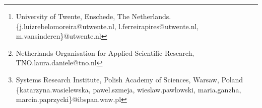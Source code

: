 \documentclass{sig-alternate-05-2015}
\begin{document}
\author{
%
%
\alignauthor
João Moreira\thanks{University of Twente, Enschede, The Netherlands.\newline\{j.luizrebelomoreira@utwente.nl, l.ferreirapires@utwente.nl, m.vansinderen\}@utwente.nl } 
\alignauthor
Laura Danielle\thanks{Netherlands Organisation for Applied Scientific Research, TNO.\newline laura.daniele@tno.nl}\\
\alignauthor 
Luis Ferreira Pires\footnotemark[1]\\
\and  %
\alignauthor 
Marten van Sinderen\footnotemark[1]\\
\alignauthor 
Katarzyna Wasielewska\thanks{Systems Research Institute, Polish Academy of Sciences, Warsaw, Poland \newline\{katarzyna.wasielewska, pawel.szmeja, wieslaw.pawlowski, maria.ganzha, marcin.paprzycki\}@ibspan.waw.pl}\\
}
\end{document}

